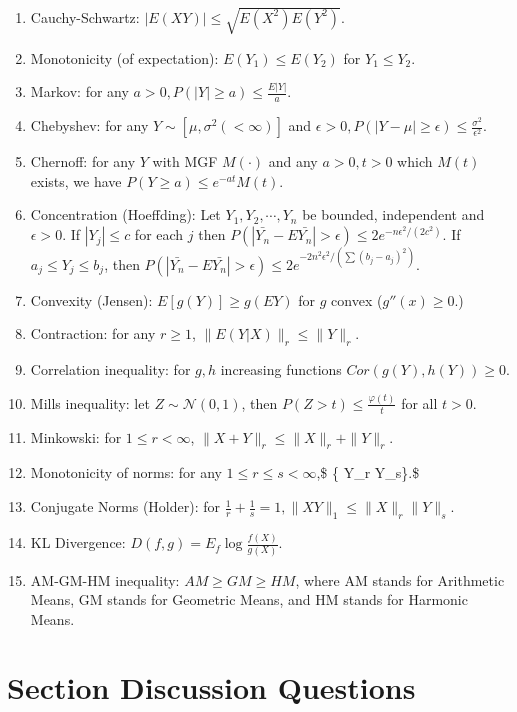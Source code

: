 \documentclass[
  letterpaper,
  DIV=11,
  numbers=noendperiod]{scrreprt}
\newcommand{\N}{\mathcal{N}}
\theoremstyle{definition}
\theoremstyle{plain}
\theoremstyle{remark}
\begin{document}
\begin{enumerate}
\def\labelenumi{\arabic{enumi}.}
\item
  Cauchy-Schwartz: \({|E(XY)| \leq \sqrt{ E(X^2)E(Y^2) }}.\)
\item
  Monotonicity (of expectation): \(E(Y_1) \leq E(Y_2)\) for
  \(Y_1\leq Y_2.\)
\item
  Markov: for any \(a>0, {P(|Y|\geq a ) \leq \frac{E|Y|}{a} }.\)
\item
  Chebyshev: for any \(Y\sim [\mu,\sigma^2 (<\infty)]\) and
  \(\epsilon>0, {P(|Y-\mu| \geq \epsilon ) \leq \frac{\sigma^2}{\epsilon^2}}.\)
\item
  Chernoff: for any \(Y\) with MGF \(M(\cdot)\) and any \(a>0,t>0\)
  which \(M(t)\) exists, we have \(P(Y\geq a ) \leq e^{-at}M(t).\)
\item
  Concentration (Hoeffding): Let \(Y_1,Y_2,\cdots,Y_n\) be bounded,
  independent and \(\epsilon>0.\) If \(|Y_j|\leq c\) for each \(j\) then
  \(P( |\bar{Y_n} - E\bar{Y_n}|>\epsilon ) \leq 2 e^{-n\epsilon^2 /(2c^2)}.\)
  If \(a_j \leq Y_j \leq b_j\), then
  \(P( |\bar{Y_n} - E\bar{Y_n}|>\epsilon ) \leq 2 e^{-2n^2\epsilon^2 /(\sum (b_j-a_j)^2)}.\)
\item
  Convexity (Jensen): \(E[g(Y)] \geq g(EY)\) for \(g\) convex
  (\(g''(x) \geq 0.\))
\item
  Contraction: for any \(r\geq 1\), \(\| E(Y|X)\| _r \leq \|Y\|_r.\)
\item
  Correlation inequality: for \(g,h\) increasing functions
  \(Cor(g(Y),h(Y)) \geq 0.\)
\item
  Mills inequality: let \(Z \sim \N(0,1)\), then
  \(P(Z > t ) \leq \frac{\varphi(t)}{t}\) for all \(t>0.\)
\item
  Minkowski: for \(1\leq r <\infty\),
  \(\|X+Y\|_r \leq \|X\|_r + \|Y\|_r.\)
\item
  Monotonicity of norms: for any \(1 \leq r \leq s <\infty\),\$ \{
  \textbar Y\textbar\_r \leq \textbar Y\textbar\_s\}.\$
\item
  Conjugate Norms (Holder): for
  \(\frac{1}{r} + \frac{1}{s}= 1, {\|XY\|_1 \leq \|X\|_r \|Y\|_s}.\)
\item
  KL Divergence: \(D(f,g) = E_f \log \frac{f(X)}{g(X)}.\)
\item
  AM-GM-HM inequality: \(AM \geq GM \geq HM\), where AM stands for
  Arithmetic Means, GM stands for Geometric Means, and HM stands for
  Harmonic Means.
\end{enumerate}

\hypertarget{section-discussion-questions-6}{%
\section*{Section Discussion
Questions}\label{section-discussion-questions-6}}
\end{document}
